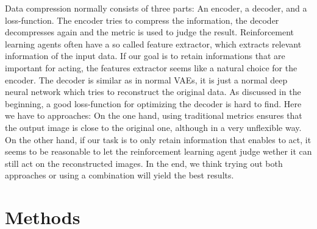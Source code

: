 \documentclass[a4paper]{scrartcl}
\begin{document}
    Data compression normally consists of three parts: An encoder, a decoder,
    and a loss-function. The encoder tries to compress the information, the
    decoder decompresses again and the metric is used to judge the result.
    Reinforcement learning agents often have a so called feature extractor,
    which extracts relevant information of the input data. If our goal is to
    retain informations that are important for acting, the features extractor
    seems like a natural choice for the encoder. The decoder is similar as in
    normal VAEs, it is just a normal deep neural network which tries to
    reconstruct the original data. As discussed in the beginning, a good
    loss-function for optimizing the decoder is hard to find. Here we have to
    approaches: On the one hand, using traditional metrics ensures that the
    output image is close to the original one, although in a very unflexible
    way. On the other hand, if our task is to only retain information that
    enables to act, it seems to be reasonable to let the reinforcement learning
    agent judge wether it can still act on the reconstructed images. In the end,
    we think trying out both approaches or using a combination will yield the
    best results.
    
\section{Methods}
\end{document}
